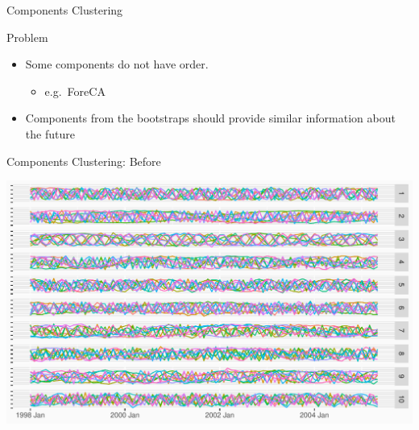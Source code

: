 \documentclass[14pt,ignorenonframetext,]{beamer}
\providecommand{\tightlist}{%
  \setlength{\itemsep}{0pt}\setlength{\parskip}{0pt}}
\begin{document}
\begin{frame}{Components Clustering}
\protect\hypertarget{components-clustering}{}
\begin{block}{Problem}
\protect\hypertarget{problem}{}
\begin{itemize}
\tightlist
\item
  Some components do not have order.

  \begin{itemize}
  \tightlist
  \item
    e.g.~ForeCA
  \end{itemize}
\item
  Components from the bootstraps should provide similar information
  about the future
\end{itemize}
\end{block}
\end{frame}

\begin{frame}{Components Clustering: Before}
\protect\hypertarget{components-clustering-before}{}
\begin{center}
\includegraphics[width=\linewidth]{plot/p_cluster_before}
\end{center}
\end{frame}
\end{document}
